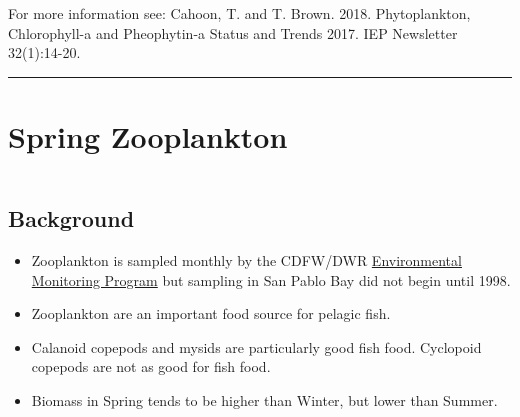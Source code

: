 \documentclass[
]{book}
\providecommand{\tightlist}{%
  \setlength{\itemsep}{0pt}\setlength{\parskip}{0pt}}
\begin{document}
\begin{disclaimer}
For more information see: Cahoon, T. and T. Brown. 2018. Phytoplankton,
Chlorophyll-a and Pheophytin-a Status and Trends 2017. IEP Newsletter
32(1):14-20.
\end{disclaimer}

\begin{center}\rule{0.5\linewidth}{0.5pt}\end{center}

\hypertarget{spring-zooplankton}{%
\section{Spring Zooplankton}\label{spring-zooplankton}}

\begin{column}{0.7\textwidth}
\hypertarget{background-3}{%
\subsection{Background}\label{background-3}}

\begin{itemize}
\tightlist
\item
  Zooplankton is sampled monthly by the CDFW/DWR \href{https://emp.baydeltalive.com/wiki/12297}{Environmental Monitoring Program} but sampling in San Pablo Bay did not begin until 1998.
\item
  Zooplankton are an important food source for pelagic fish.
\item
  Calanoid copepods and mysids are particularly good fish food. Cyclopoid copepods are not as good for fish food.
\item
  Biomass in Spring tends to be higher than Winter, but lower than Summer.
\end{itemize}
\end{column}
\end{document}
